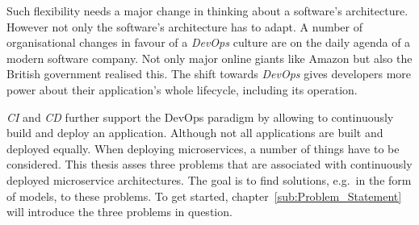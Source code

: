 Such flexibility needs a major change in thinking about a software's
architecture. However not only the software's architecture has to adapt. A
number of organisational changes in favour of a \textit{DevOps} culture are on
the daily agenda of a modern software company. Not only major online giants
like Amazon \autocite{JenkinsVelocityCulture2011} but also the British
government \autocite{LoweLeadingwaymicroservices2016} realised this. The shift
towards \textit{DevOps} gives developers more power about
their application's whole lifecycle, including its operation. 

\textit{\acf{CI}} and \textit{\acf{CD}} further support the DevOps paradigm by
allowing to continuously build and deploy an application. Although not all
applications are built and deployed equally. When deploying microservices, a
number of things have to be considered. This thesis asses  three problems that are associated with continuously
deployed microservice architectures. The goal is to find solutions, e.g.\ in
the form of models, to these problems. To get started,
chapter~\ref{sub:Problem_Statement} will introduce the three problems in
question.
